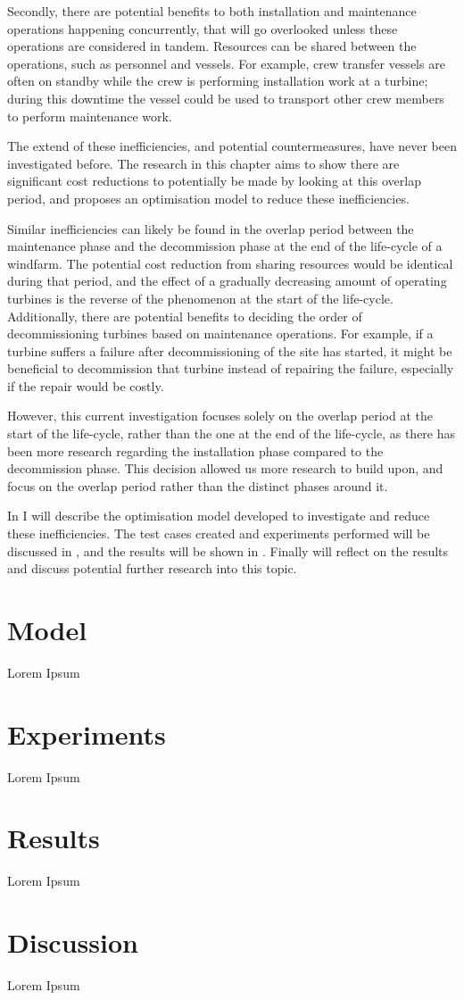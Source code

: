 \documentclass[a4paper,12pt]{report}
\begin{document}
Secondly, there are potential benefits to both installation and maintenance operations happening concurrently, that will go overlooked unless these operations are considered in tandem. Resources can be shared between the operations, such as personnel and vessels. For example, crew transfer vessels are often on standby while the crew is performing installation work at a turbine; during this downtime the vessel could be used to transport other crew members to perform maintenance work. 

The extend of these inefficiencies, and potential countermeasures, have never been investigated before. The research in this chapter aims to show there are significant cost reductions to potentially be made by looking at this overlap period, and proposes an optimisation model to reduce these inefficiencies. 

\bigskip

Similar inefficiencies can likely be found in the overlap period between the maintenance phase and the decommission phase at the end of the life-cycle of a windfarm. The potential cost reduction from sharing resources would be identical during that period, and the effect of a gradually decreasing amount of operating turbines is the reverse of the phenomenon at the start of the life-cycle. Additionally, there are potential benefits to deciding the order of decommissioning turbines based on maintenance operations. For example, if a turbine suffers a failure after decommissioning of the site has started, it might be beneficial to decommission that turbine instead of repairing the failure, especially if the repair would be costly. 

However, this current investigation focuses solely on the overlap period at the start of the life-cycle, rather than the one at the end of the life-cycle, as there has been more research regarding the installation phase compared to the decommission phase. This decision allowed us more research to build upon, and focus on the overlap period rather than the distinct phases around it. 

\bigskip

In  I will describe the optimisation model developed to investigate and reduce these inefficiencies. The test cases created and experiments performed will be discussed in , and the results will be shown in . Finally  will reflect on the results and discuss potential further research into this topic. 

\section{Model} \label{s:model}
Lorem Ipsum %

\section{Experiments} \label{s:expr}
Lorem Ipsum %

\section{Results} \label{s:resul}
Lorem Ipsum %

\section{Discussion} \label{s:disc}
Lorem Ipsum %

\pagebreak



\end{document}

